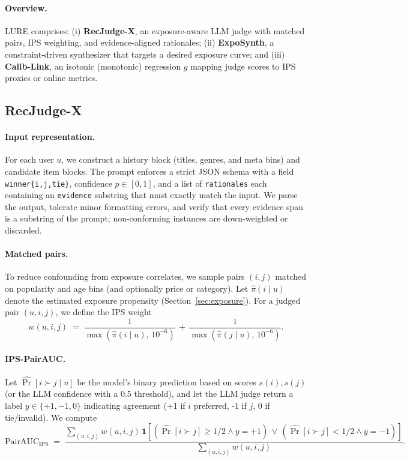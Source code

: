 \documentclass[10pt]{article}
\begin{document}
\paragraph{Overview.} LURE comprises: (i) \textbf{RecJudge-X}, an exposure-aware LLM judge with matched pairs, IPS weighting, and evidence-aligned rationales; (ii) \textbf{ExpoSynth}, a constraint-driven synthesizer that targets a desired exposure curve; and (iii) \textbf{Calib-Link}, an isotonic (monotonic) regression \(g\) mapping judge scores to IPS proxies or online metrics.

\subsection{RecJudge-X}
\paragraph{Input representation.} For each user \(u\), we construct a history block (titles, genres, and meta bins) and candidate item blocks. The prompt enforces a strict JSON schema with a field \texttt{winner\;\in\;\{i,j,tie\}}, confidence \(p \in [0,1]\), and a list of \texttt{rationales} each containing an \texttt{evidence} substring that must exactly match the input. We parse the output, tolerate minor formatting errors, and verify that every evidence span is a substring of the prompt; non-conforming instances are down-weighted or discarded.

\paragraph{Matched pairs.} To reduce confounding from exposure correlates, we sample pairs \((i,j)\) matched on popularity and age bins (and optionally price or category). Let \(\hat{\pi}(i\mid u)\) denote the estimated exposure propensity (Section~\ref{sec:exposure}). For a judged pair \((u,i,j)\), we define the IPS weight
\begin{equation}
  w(u,i,j) \;=\; \frac{1}{\max(\hat{\pi}(i\mid u),\,10^{-6})} \, + \, \frac{1}{\max(\hat{\pi}(j\mid u),\,10^{-6})} .
\end{equation}

\paragraph{IPS-PairAUC.} Let \(\widehat{\Pr}[i\succ j\mid u]\) be the model’s binary prediction based on scores \(s(i), s(j)\) (or the LLM confidence with a 0.5 threshold), and let the LLM judge return a label \(y\in\{+1,-1,0\}\) indicating agreement (+1 if \(i\) preferred, -1 if \(j\), 0 if tie/invalid). We compute
\begin{equation}
  \mathrm{PairAUC}_{\text{IPS}} \;=\; \frac{\sum_{(u,i,j)} w(u,i,j)\, \mathbf{1}[(\widehat{\Pr}[i\succ j]\ge 1/2 \land y=+1)\,\lor\,(\widehat{\Pr}[i\succ j]<1/2 \land y=-1)]}{\sum_{(u,i,j)} w(u,i,j)}.
\end{equation}
\end{document}
